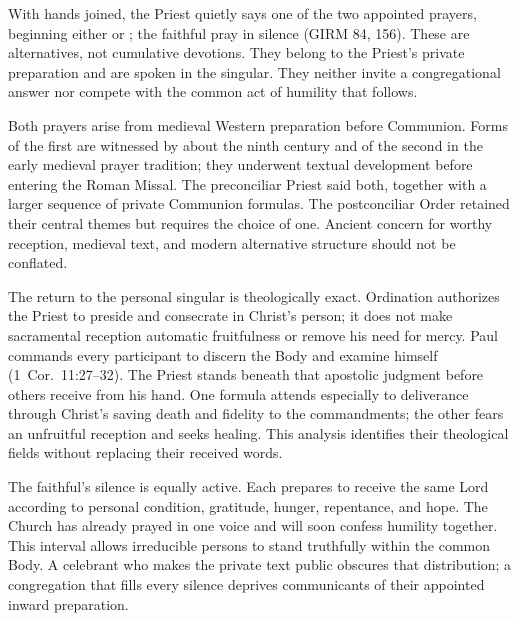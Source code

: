 
With hands joined, the Priest quietly says one of the two appointed prayers, beginning either  or ; the faithful pray in silence (GIRM 84, 156). These are alternatives, not cumulative devotions. They belong to the Priest's private preparation and are spoken in the singular. They neither invite a congregational answer nor compete with the common act of humility that follows.

Both prayers arise from medieval Western preparation before Communion. Forms of the first are witnessed by about the ninth century and of the second in the early medieval prayer tradition; they underwent textual development before entering the Roman Missal. The preconciliar Priest said both, together with a larger sequence of private Communion formulas. The postconciliar Order retained their central themes but requires the choice of one. Ancient concern for worthy reception, medieval text, and modern alternative structure should not be conflated.

The return to the personal singular is theologically exact. Ordination authorizes the Priest to preside and consecrate in Christ's person; it does not make sacramental reception automatic fruitfulness or remove his need for mercy. Paul commands every participant to discern the Body and examine himself (1~Cor.~11:27--32). The Priest stands beneath that apostolic judgment before others receive from his hand. One formula attends especially to deliverance through Christ's saving death and fidelity to the commandments; the other fears an unfruitful reception and seeks healing. This analysis identifies their theological fields without replacing their received words.

The faithful's silence is equally active. Each prepares to receive the same Lord according to personal condition, gratitude, hunger, repentance, and hope. The Church has already prayed in one voice and will soon confess humility together. This interval allows irreducible persons to stand truthfully within the common Body. A celebrant who makes the private text public obscures that distribution; a congregation that fills every silence deprives communicants of their appointed inward preparation.



